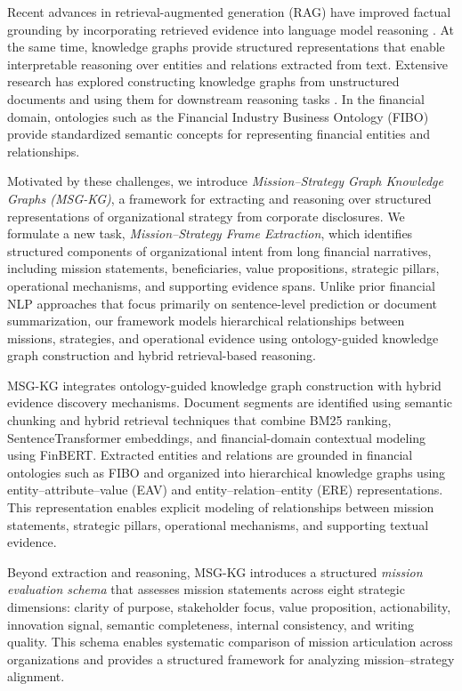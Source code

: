 \documentclass[11pt]{article}
\begin{document}
Recent advances in retrieval-augmented generation (RAG) have improved factual grounding by incorporating retrieved evidence into language model reasoning \cite{lewis2020retrieval}. At the same time, knowledge graphs provide structured representations that enable interpretable reasoning over entities and relations extracted from text. Extensive research has explored constructing knowledge graphs from unstructured documents and using them for downstream reasoning tasks \cite{banko2007openie,miwa2016relation,ji2022survey}. In the financial domain, ontologies such as the Financial Industry Business Ontology (FIBO) provide standardized semantic concepts for representing financial entities and relationships.

Motivated by these challenges, we introduce \textit{Mission--Strategy Graph Knowledge Graphs (MSG-KG)}, a framework for extracting and reasoning over structured representations of organizational strategy from corporate disclosures. We formulate a new task, \textit{Mission--Strategy Frame Extraction}, which identifies structured components of organizational intent from long financial narratives, including mission statements, beneficiaries, value propositions, strategic pillars, operational mechanisms, and supporting evidence spans. Unlike prior financial NLP approaches that focus primarily on sentence-level prediction or document summarization, our framework models hierarchical relationships between missions, strategies, and operational evidence using ontology-guided knowledge graph construction and hybrid retrieval-based reasoning.

MSG-KG integrates ontology-guided knowledge graph construction with hybrid evidence discovery mechanisms. Document segments are identified using semantic chunking and hybrid retrieval techniques that combine BM25 ranking, SentenceTransformer embeddings, and financial-domain contextual modeling using FinBERT. Extracted entities and relations are grounded in financial ontologies such as FIBO and organized into hierarchical knowledge graphs using entity--attribute--value (EAV) and entity--relation--entity (ERE) representations. This representation enables explicit modeling of relationships between mission statements, strategic pillars, operational mechanisms, and supporting textual evidence.

Beyond extraction and reasoning, MSG-KG introduces a structured \textit{mission evaluation schema} that assesses mission statements across eight strategic dimensions: clarity of purpose, stakeholder focus, value proposition, actionability, innovation signal, semantic completeness, internal consistency, and writing quality. This schema enables systematic comparison of mission articulation across organizations and provides a structured framework for analyzing mission--strategy alignment.
\end{document}
